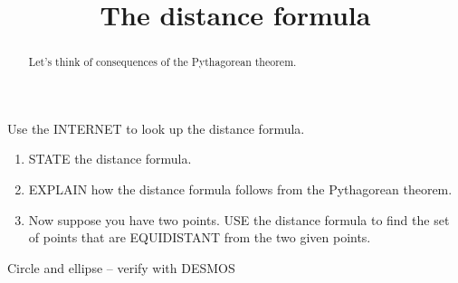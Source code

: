 \documentclass[nooutcomes,noauthor,handout]{ximera}
\title{The distance formula}
\begin{document}
\begin{abstract}
  Let's think of consequences of the Pythagorean theorem.
\end{abstract}
\maketitle


\begin{listOutcomes}
\item 
\end{listOutcomes}


\mynewpage



\begin{question}
  Use the INTERNET to look up the distance formula. 
  \begin{enumerate}
    \item STATE the distance formula. 
    \item EXPLAIN how the distance formula follows from the
      Pythagorean theorem.
    \item Now suppose you have two points. USE the distance formula to
      find the set of points that are EQUIDISTANT from the two given
      points.
  \end{enumerate}
  \begin{freeResponse}
  \end{freeResponse}
\end{question}
\mynewpage


\begin{question}
  Circle and ellipse -- verify with DESMOS
\end{question}
\mynewpage


\end{document}

